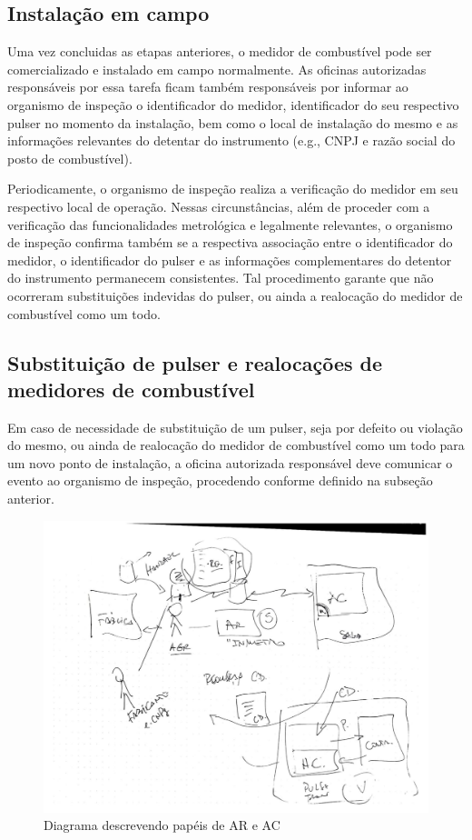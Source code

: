 \documentclass[12pt]{article}
\begin{document}
\subsection{Instalação em campo}
Uma vez concluidas as etapas anteriores, o medidor de combustível pode ser comercializado e instalado em campo normalmente.
As oficinas autorizadas responsáveis por essa tarefa ficam também responsáveis por informar ao organismo de inspeção o identificador do medidor, identificador do seu respectivo pulser no momento da instalação, bem como o local de instalação do mesmo e as informações relevantes do detentar do instrumento (e.g., CNPJ e razão social do posto de combustível).

Periodicamente, o organismo de inspeção realiza a verificação do medidor em seu respectivo local de operação.
Nessas circunstâncias, além de proceder com a verificação das funcionalidades metrológica e legalmente relevantes, o organismo de inspeção confirma também se a respectiva associação entre o identificador do medidor, o identificador do pulser e as informações complementares do detentor do instrumento permanecem consistentes.
Tal procedimento garante que não ocorreram substituições indevidas do pulser, ou ainda a realocação do medidor de combustível como um todo.

\subsection{Substituição de pulser e realocações de medidores de combustível}
Em caso de necessidade de substituição de um pulser, seja por defeito ou violação do mesmo, ou ainda de realocação do medidor de combustível como um todo para um novo ponto de instalação, a oficina autorizada responsável deve comunicar o evento ao organismo de inspeção, procedendo conforme definido na subseção anterior.

\begin{figure}[ht]
\centering
\includegraphics[width=1\textwidth]{ruy.pdf}
\caption{Diagrama descrevendo papéis de AR e AC}
\label{f:ruy}
\end{figure}
\end{document}
